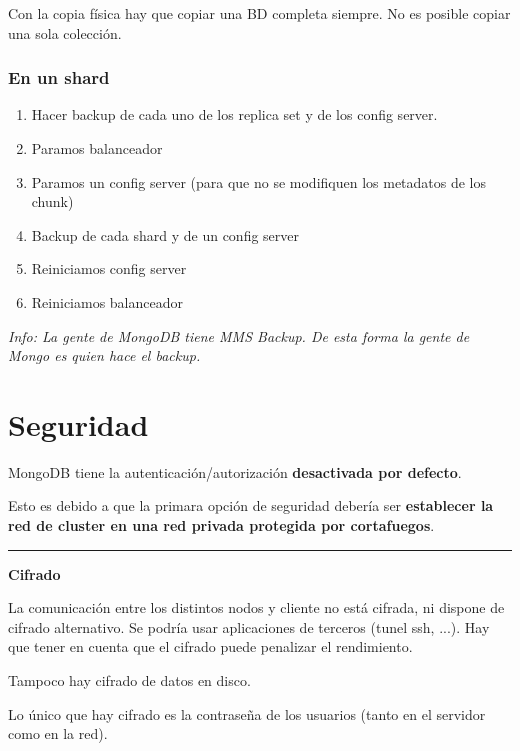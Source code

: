 \documentclass[a4paper,10pt,english]{sphinxmanual}
\begin{document}
Con la copia física hay que copiar una BD completa siempre. No es posible copiar una sola colección.


\subsection{En un shard}
\label{contents/backups:en-un-shard}\begin{enumerate}
\item {} 
Hacer backup de cada uno de los replica set y de los config server.

\item {} 
Paramos balanceador

\item {} 
Paramos un config server (para que no se modifiquen los metadatos de los chunk)

\item {} 
Backup de cada shard y de un config server

\item {} 
Reiniciamos config server

\item {} 
Reiniciamos balanceador

\end{enumerate}

\emph{Info: La gente de MongoDB tiene MMS Backup. De esta forma la gente de Mongo es quien hace el backup.}


\chapter{Seguridad}
\label{contents/security::doc}\label{contents/security:seguridad}
MongoDB tiene la autenticación/autorización \textbf{desactivada por defecto}.

Esto es debido a que la primara opción de seguridad debería ser \textbf{establecer la red de cluster en una red privada protegida por cortafuegos}.


\bigskip\hrule{}\bigskip


\textbf{Cifrado}

La comunicación entre los distintos nodos y cliente no está cifrada, ni dispone de cifrado alternativo. Se podría usar aplicaciones de terceros (tunel ssh, ...). Hay que tener en cuenta que el cifrado puede penalizar el rendimiento.

Tampoco hay cifrado de datos en disco.

Lo único que hay cifrado es la contraseña de los usuarios (tanto en el servidor como en la red).
\end{document}
